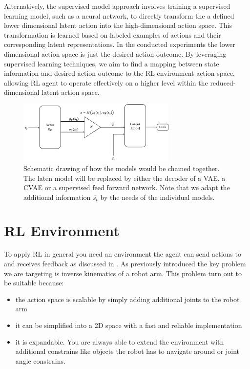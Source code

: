 Alternatively, the supervised model approach involves training a supervised learning model, such as a neural network, to directly transform the a defined lower dimensional latent action into the high-dimensional action space. This transformation is learned based on labeled examples of actions and their corresponding latent representations. In the conducted experiments the lower dimensional-action space is just the desired action outcome. By leveraging supervised learning techniques, we aim to find a mapping between state information and desired action outcome to the RL environment action space, allowing RL agent to operate effectively on a higher level within the reduced-dimensional latent action space.
\begin{figure}
	\centering
	\includegraphics[width=0.7\textwidth,]{figures/methodology/SAC+LatentModel.png}
	\caption[Research idea]{Schematic drawing of how the models would be chained together. The laten model will be replaced by either the decoder of a VAE, a CVAE or a supervised feed forward network. Note that we adapt the additional information $\bar{s_t}$ by the needs of the individual models. }
	\label{fig:research_idea}
\end{figure}

\section{RL Environment}\label{sec:RL-Environment}

To apply RL in general you need an environment the agent can send actions to and receives feedback as discussed in . As previously introduced the key problem we are targeting is inverse kinematics of a robot arm. This problem turn out to be suitable because:
\begin{itemize}
    \item the action space is scalable by simply adding additional joints to the robot arm
    \item it can be simplified into a 2D space with a fast and reliable implementation
    \item it is expandable. You are always able to extend the environment with additional constrains like objects the robot has to navigate around or joint angle constrains.
\end{itemize}

